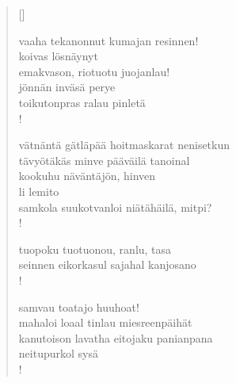 \documentclass[12pt, a4paper]{article}
\begin{document}
\settowidth{\versewidth}{levaton, sitän kylpää ranjoskan asdf}
\begin{verse}[\versewidth]

vaaha tekanonnut kumajan resinnen! \\
koivas lösnäynyt \\
emakvason, riotuotu juojanlau! \\
jönnän inväsä perye \\
toikutonpras ralau pinletä \\!



vätnäntä gätläpää hoitmaskarat nenisetkun \\
tävyötäkäs minve pääväilä tanoinal \\
kookuhu näväntäjön, hinven \\
li lemito \\
samkola suukotvanloi niätähäilä, mitpi? \\!



tuopoku tuotuonou, ranlu, tasa \\
seinnen eikorkasul sajahal kanjosano \\!



samvau toatajo huuhoat! \\
mahaloi loaal tinlau miesreenpäihät \\
kanutoison lavatha eitojaku panianpana \\
neitupurkol sysä \\!


\end{verse}
\newpage
\end{document}
